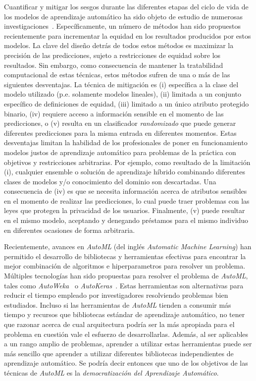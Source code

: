 Cuantificar y mitigar los sesgos durante las diferentes etapas del ciclo de vida de los modelos de aprendizaje automático ha sido objeto de estudio de numerosas investigaciones~\parencite{barocas-hardt-narayanan}.
Específicamente, un número de métodos han sido propuestos recientemente para incrementar la equidad en los resultados producidos por estos modelos.
La clave del diseño detrás de todos estos métodos es maximizar la precisión de las predicciones, sujeto a restricciones de equidad sobre los resultados.
Sin embargo, como consecuencia de mantener la tratabilidad computacional de estas técnicas, estos métodos sufren de una o más de las siguientes desventajas.
La técnica de mitigación es
(i) específica a la clase del modelo utilizado (p.e. solamente modelos lineales),
(ii) limitada a un conjunto específico de definiciones de equidad,
(iii) limitado a un único atributo protegido binario,
(iv) requiere acceso a información sensible en el momento de las predicciones, o
(v) resulta en un clasificador \emph{randomizado} que puede generar diferentes predicciones para la misma entrada en diferentes momentos.
Estas desventajas limitan la habilidad de los profesionales de poner en funcionamiento modelos justos de aprendizaje automático para problemas de la práctica con objetivos y restricciones arbitrarias.
Por ejemplo, como resultado de la limitación (i), cualquier ensemble o solución de aprendizaje híbrido combinando diferentes clases de modelos y/o conocimiento del dominio son descartadas.
Una consecuencia de (iv) es que se necesita información acerca de atributos sensibles en el momento de realizar las predicciones, lo cual puede traer problemas con las leyes que protegen la privacidad de los usuarios.
Finalmente, (v) puede resultar en el mismo modelo, aceptando y denegando préstamos para el mismo individuo en diferentes ocasiones de forma arbitraria.


Recientemente, avances en \emph{AutoML} (del inglés \emph{Automatic Machine Learning}) han permitido el desarrollo de bibliotecas y herramientas efectivas para encontrar la mejor combinación de algoritmos e hiperparametros para resolver un problema.
Múltiples tecnologías han sido propuestas para resolver el problema de \emph{AutoML}, tales como \emph{AutoWeka}~\parencite{autoweka} o \emph{AutoKeras}~\parencite{autoKeras}.
Estas herramientas son alternativas para reducir el tiempo empleado por investigadores resolviendo problemas bien estudiados.
Incluso si las herramientas de \emph{AutoML} tienden a consumir más tiempo y recursos que bibliotecas estándar de aprendizaje automático, no tener que razonar acerca de cual arquitectura podría ser la más apropiada para el problema en cuestión vale el esfuerzo de desarrollarlas.
Además, al ser aplicables a un rango amplio de problemas, aprender a utilizar estas herramientas puede ser más sencillo que aprender a utilizar diferentes bibliotecas independientes de aprendizaje automático.
Se podría decir entonces que uno de los objetivos de las técnicas de \emph{AutoML} es la \emph{democratización del Aprendizaje Automático}.

